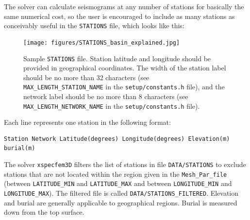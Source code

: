 \vspace{1cm}

The solver can calculate seismograms at any number of stations for
basically the same numerical cost, so the user is encouraged to include
as many stations as conceivably useful in the \texttt{STATIONS} file,
which looks like this:
%
\begin{figure}[H]
\begin{centering}
\texttt{[image: figures/STATIONS\_basin\_explained.jpg]}
\par
\end{centering}
\caption{Sample \texttt{STATIONS} file. Station latitude and longitude should
be provided in geographical coordinates. The width of the station
label should be no more than 32 characters (see \texttt{MAX\_LENGTH\_STATION\_NAME}
in the \texttt{setup/constants.h} file), and the network label should be
no more than 8 characters (see \texttt{MAX\_LENGTH\_NETWORK\_NAME}
in the \texttt{setup/constants.h} file).}
\label{fig:Sample-STATIONS-file.}
\end{figure}


\noindent
Each line represents one station in the following format:
{\small
\begin{verbatim}
Station Network Latitude(degrees) Longitude(degrees) Elevation(m) burial(m)
\end{verbatim}
}
The solver \texttt{xspecfem3D} filters the list of stations in file
\texttt{DATA/STATIONS} to exclude stations that are not located within
the region given in the \texttt{Mesh\_Par\_file} (between \texttt{LATITUDE\_MIN}
and \texttt{LATITUDE\_MAX} and between \texttt{LONGITUDE\_MIN} and
\texttt{LONGITUDE\_MAX}). The filtered file is called \texttt{DATA/STATIONS\_FILTERED}.
Elevation and burial are generally applicable to geographical regions.
Burial is measured down from the top surface.\newline


